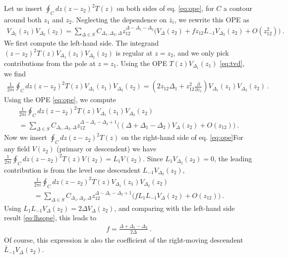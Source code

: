 \documentclass[12pt, a4paper]{article}
\theoremstyle{break}
\begin{document}
Let us insert $\oint_C dz(z-z_2)^2 T(z)$ on both sides of eq. \eqref{eq:ope}, for $C$ a contour around both $z_1$ and $z_2$. Neglecting the dependence on $\bar z_i$, we rewrite this OPE as 
\begin{align}
 V_{\Delta_1}(z_1) V_{\Delta_2}(z_2) 
 = \sum_{\Delta\in S} C_{\Delta_1,\Delta_2,\Delta} z_{12}^{\Delta-\Delta_1-\Delta_2}
 \Big(V_{\Delta}(z_2) + f z_{12} L_{-1}V_{\Delta_2}(z_2) + O(z_{12}^2) \Big)\ .
\end{align}
We first compute the left-hand side. The integrand $(z-z_2)^2 T(z) V_{\Delta_1}(z_1)V_{\Delta_2}(z_2)$ is regular at $z=z_2$, and we only pick contributions from the pole at $z=z_1$. Using the OPE $T(z)V_{\Delta_1}(z_1)$ \eqref{eq:tvd}, we find 
\begin{align}
 \frac{1}{2\pi i}\oint_C dz(z-z_2)^2 T(z)V_{\Delta_1}(z_1)V_{\Delta_2}(z_2) = \left(2z_{12}\Delta_1+z_{12}^2\frac{\partial}{\partial z_1}\right) V_{\Delta_1}(z_1) V_{\Delta_2}(z_2)\ .
\end{align}
Using the OPE \eqref{eq:ope}, we compute 
\begin{multline}
 \frac{1}{2\pi i}\oint_C dz(z-z_2)^2 T(z)V_{\Delta_1}(z_1)V_{\Delta_2}(z_2)
 \\
 = \sum_{\Delta\in S} C_{\Delta_1,\Delta_2,\Delta} z_{12}^{\Delta-\Delta_1-\Delta_2+1} 
 \Big( (\Delta+\Delta_1-\Delta_2)V_{\Delta}(z_2) + O(z_{12}) \Big)\ .
 \label{eq:lhsope}
\end{multline}
Now we insert $\oint_C dz(z-z_2)^2 T(z)$ on the right-hand side of eq. \eqref{eq:ope}For any field $V(z_2)$ (primary or descendent) we have $\frac{1}{2\pi i}\oint_C dz(z-z_2)^2 T(z)V(z_2) = L_1 V(z_2)$. Since $L_1 V_{\Delta_2}(z_2)=0$, the leading contribution is from the level one descendent $L_{-1} V_{\Delta_2}(z_2)$,
\begin{multline}
 \frac{1}{2\pi i}\oint_C dz(z-z_2)^2 T(z)V_{\Delta_1}(z_1)V_{\Delta_2}(z_2)
 \\
 = \sum_{\Delta\in S} C_{\Delta_1,\Delta_2,\Delta} z_{12}^{\Delta-\Delta_1-\Delta_2+1} 
 \Big( f L_1L_{-1}V_{\Delta}(z_2) + O(z_{12}) \Big)\ .
\end{multline}
Using $L_1L_{-1}V_{\Delta}(z_2)=2\Delta V_\Delta(z_2)$, and comparing with the left-hand side result \eqref{eq:lhsope}, this leads to 
\begin{align}
 f = \frac{\Delta+\Delta_1-\Delta_2}{2\Delta}\ .
\end{align}
Of course, this expression is also the coefficient of the right-moving descendent $\bar L_{-1} V_\Delta(z_2)$.
\end{document}
